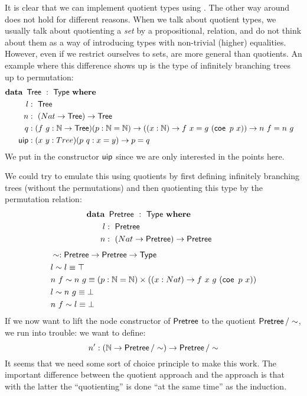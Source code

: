 \documentclass[a4paper,10pt]{report}
\begin{document}
It is clear that we can implement quotient types using \hits. The
other way around does not hold for different reasons. When we talk
about quotient types, we usually talk about quotienting a \emph{set}
by a propositional, relation, and do not think about them as a way of
introducing types with non-trivial (higher) equalities. However, even
if we restrict ourselves to sets, \hits are more general than
quotients. An example where this difference shows up is the type of
infinitely branching trees up to permutation:
%
\begin{alignat*}{2}
  &\rlap{$\data\ \Tree\ :\ \Type\ \where$} \\
  &&\ \ l     &:\ \Tree \\
  &&\ \ n     &:\ (Nat \to \Tree) \to \Tree \\
  &&\ \ q     &:(f\ g : \Nat \to \Tree) (p : \Nat = \Nat) \to ((x : \Nat) \to f\ x = g\ (\coe\ p\ x)) \to n\ f = n\ g \\
  &&\ \ \uipc &:(x\ y : Tree) (p\ q : x = y) \to p = q
\end{alignat*}
%
We put in the constructor $\operatorname{\mathsf{uip}}$ since we are only interested in the points here.

We could try to emulate this \hit using quotients by first defining
infinitely branching trees (without the permutations) and then
quotienting this type by the permutation relation:
%
\begin{alignat*}{2}
  &\rlap{$\data\ \Pretree\ :\ \Type\ \where$} \\
  &&\ \ l     &:\ \Pretree \\
  &&\ \ n     &:\ (Nat \to \Pretree) \to \Pretree \\
\end{alignat*}
%
\begin{align*}
  &\sim : \Pretree \to \Pretree \to \Type \\
  &l \sim l \defeq \top \\
  &n\ f \sim n\ g \defeq (p : \Nat = \Nat) \times ((x : Nat) \to f\ x ~ g\ (\coe\ p\ x)) \\
  &l \sim n\ g \defeq \bot \\
  &n\ f \sim l \defeq \bot
\end{align*}
%
If we now want to lift the node constructor of $\operatorname{\mathsf{Pretree}}$ to the
quotient $\operatorname{\mathsf{Pretree}}/\sim$, we run into trouble: we want to define:
$$
n' : (\mathbb{N} \to \operatorname{\mathsf{Pretree}}/\sim) \to \operatorname{\mathsf{Pretree}}/\sim
$$
It seems that we need some sort of choice principle to make this
work. The important difference between the quotient approach and the
\hit approach is that with the latter the ``quotienting'' is done ``at
the same time'' as the induction.
\end{document}
